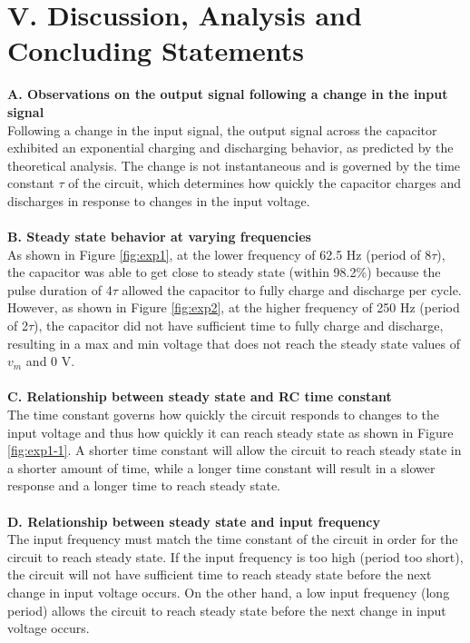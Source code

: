 \documentclass[12pt]{article}
\begin{document}
\section*{V. Discussion, Analysis and Concluding Statements}
\textbf{A. Observations on the output signal following a change in the input signal}\\
Following a change in the input signal, the output signal across the capacitor exhibited an exponential charging and discharging behavior, as predicted by the theoretical analysis. The change is not instantaneous and is governed by the time constant $\tau$ of the circuit, which determines how quickly the capacitor charges and discharges in response to changes in the input voltage.\\\\
\textbf{B. Steady state behavior at varying frequencies}\\
As shown in Figure \ref{fig:exp1}, at the lower frequency of 62.5 Hz (period of 8$\tau$), the capacitor was able to get close to steady state (within 98.2\%) because the pulse duration of 4$\tau$ allowed the capacitor to fully charge and discharge per cycle. However, as shown in Figure \ref{fig:exp2}, at the higher frequency of 250 Hz (period of 2$\tau$), the capacitor did not have sufficient time to fully charge and discharge, resulting in a max and min voltage that does not reach the steady state values of $v_m$ and 0 V.\\\\
\textbf{C. Relationship between steady state and RC time constant}\\
The time constant governs how quickly the circuit responds to changes to the input voltage and thus how quickly it can reach steady state as shown in Figure \ref{fig:exp1-1}. A shorter time constant will allow the circuit to reach steady state in a shorter amount of time, while a longer time constant will result in a slower response and a longer time to reach steady state.\\\\
\textbf{D. Relationship between steady state and input frequency}\\
The input frequency must match the time constant of the circuit in order for the circuit to reach steady state. If the input frequency is too high (period too short), the circuit will not have sufficient time to reach steady state before the next change in input voltage occurs. On the other hand, a low input frequency (long period) allows the circuit to reach steady state before the next change in input voltage occurs.\\\\
\end{document}
